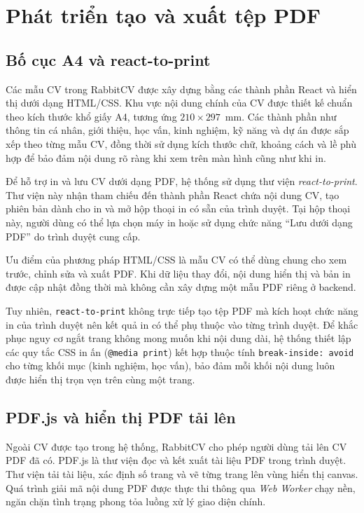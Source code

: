 \section{Phát triển tạo và xuất tệp PDF}

\subsection{Bố cục A4 và react-to-print}

Các mẫu CV trong RabbitCV được xây dựng bằng các thành phần React và hiển thị dưới dạng HTML/CSS. Khu vực nội dung chính của CV được thiết kế chuẩn theo kích thước khổ giấy A4, tương ứng $210 \times 297$~mm. Các thành phần như thông tin cá nhân, giới thiệu, học vấn, kinh nghiệm, kỹ năng và dự án được sắp xếp theo từng mẫu CV, đồng thời sử dụng kích thước chữ, khoảng cách và lề phù hợp để bảo đảm nội dung rõ ràng khi xem trên màn hình cũng như khi in.

Để hỗ trợ in và lưu CV dưới dạng PDF, hệ thống sử dụng thư viện \textit{react-to-print}. Thư viện này nhận tham chiếu đến thành phần React chứa nội dung CV, tạo phiên bản dành cho in và mở hộp thoại in có sẵn của trình duyệt. Tại hộp thoại này, người dùng có thể lựa chọn máy in hoặc sử dụng chức năng “Lưu dưới dạng PDF” do trình duyệt cung cấp.

Ưu điểm của phương pháp HTML/CSS là mẫu CV có thể dùng chung cho xem trước, chỉnh sửa và xuất PDF. Khi dữ liệu thay đổi, nội dung hiển thị và bản in được cập nhật đồng thời mà không cần xây dựng một mẫu PDF riêng ở backend.

Tuy nhiên, \texttt{react-to-print} không trực tiếp tạo tệp PDF mà kích hoạt chức năng in của trình duyệt nên kết quả in có thể phụ thuộc vào từng trình duyệt. Để khắc phục nguy cơ ngắt trang không mong muốn khi nội dung dài, hệ thống thiết lập các quy tắc CSS in ấn (\texttt{@media print}) kết hợp thuộc tính \texttt{break-inside: avoid} cho từng khối mục (kinh nghiệm, học vấn), bảo đảm mỗi khối nội dung luôn được hiển thị trọn vẹn trên cùng một trang.

\subsection{PDF.js và hiển thị PDF tải lên}

Ngoài CV được tạo trong hệ thống, RabbitCV cho phép người dùng tải lên CV PDF đã có. PDF.js là thư viện đọc và kết xuất tài liệu PDF trong trình duyệt. Thư viện tải tài liệu, xác định số trang và vẽ từng trang lên vùng hiển thị canvas. Quá trình giải mã nội dung PDF được thực thi thông qua \textit{Web Worker} chạy nền, ngăn chặn tình trạng phong tỏa luồng xử lý giao diện chính.

